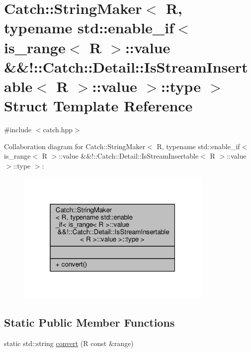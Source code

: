 \hypertarget{struct_catch_1_1_string_maker_3_01_r_00_01typename_01std_1_1enable__if_3_01is__range_3_01_r_01_4536d8fedfff6d62432b3dc59b56e1380}{\section{Catch\-:\-:String\-Maker$<$ R, typename std\-:\-:enable\-\_\-if$<$ is\-\_\-range$<$ R $>$\-:\-:value \&\&!\-:\-:Catch\-:\-:Detail\-:\-:Is\-Stream\-Insertable$<$ R $>$\-:\-:value $>$\-:\-:type $>$ Struct Template Reference}
\label{struct_catch_1_1_string_maker_3_01_r_00_01typename_01std_1_1enable__if_3_01is__range_3_01_r_01_4536d8fedfff6d62432b3dc59b56e1380}
}


{\ttfamily \#include $<$catch.\-hpp$>$}



Collaboration diagram for Catch\-:\-:String\-Maker$<$ R, typename std\-:\-:enable\-\_\-if$<$ is\-\_\-range$<$ R $>$\-:\-:value \&\&!\-:\-:Catch\-:\-:Detail\-:\-:Is\-Stream\-Insertable$<$ R $>$\-:\-:value $>$\-:\-:type $>$\-:
\nopagebreak
\begin{figure}[H]
\begin{center}
\leavevmode
\includegraphics[width=268pt]{struct_catch_1_1_string_maker_3_01_r_00_01typename_01std_1_1enable__if_3_01is__range_3_01_r_01_4eec59d83e394d757a47084f8c8fb5889}
\end{center}
\end{figure}
\subsection*{Static Public Member Functions}
\begin{DoxyCompactItemize}
\item 
static std\-::string \hyperlink{struct_catch_1_1_string_maker_3_01_r_00_01typename_01std_1_1enable__if_3_01is__range_3_01_r_01_4536d8fedfff6d62432b3dc59b56e1380_ac6088db00103a7482fb9bc04b1603362}{convert} (R const \&range)
\end{DoxyCompactItemize}



